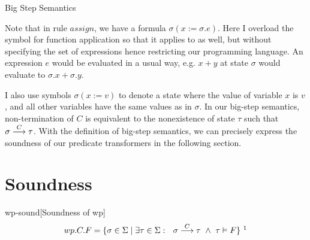 \newcommand\ddfrac[2]{\frac{\displaystyle #1}{\displaystyle #2}}
\begin{table}[t]
  \normalsize
  \centering
  \caption{Big Step Semantics}
  \label{tab:big-step}
\end{table}

Note that in rule $assign$, we have a formula $\sigma(x:=\sigma.e)$. 
Here I overload the symbol for function application  so that it applies to  as well, but without specifying the set of expressions hence restricting our programming language. 
An expression $e$ would be evaluated in a usual way, e.g. $x+y$ at state $\sigma$ would evaluate to $\sigma.x + \sigma.y$. 

I also use symbols $\sigma(x:=v)$ to denote a state where the value of variable $x$ is $v$, and all other variables have the same values as in $\sigma$.
In our big-step semantics, non-termination of $C$ is equivalent to the nonexistence of state $\tau$ such that $\sigma\stackrel{C}{\longrightarrow}\tau$. 
With the definition of big-step semantics, we can precisely express the soundness of our predicate transformers in the following section. 


\section{Soundness}
\begin{theorem}{wp-sound}[Soundness of wp]~{\normalfont\cite{zhang22}} 
\ \vspace{-1.5mm}
\[
wp.C.F = \{\sigma\in\S \mid  \exists \tau\in\S:\ \ \sigma\goto{C}\tau\ \wedge\ \tau\vDash F\}
~\protect\footnotemark
\]
\end{theorem}

